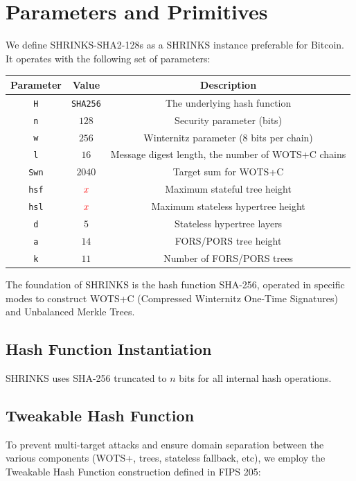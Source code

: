 \section{Parameters and Primitives}

We define SHRINKS-SHA2-128s as a SHRINKS instance preferable for Bitcoin. It operates with the 
following set of parameters:

\begin{center}
\begin{tabular}{ c c c }
 Parameter & Value & Description \\ 
 \hline
 \texttt{H} & \texttt{SHA256} & The underlying hash function \\ 
 \texttt{n} & $128$ & Security parameter (bits) \\  
 \texttt{w} & $256$ & Winternitz parameter (8 bits per chain) \\
 \texttt{l}  & $16$ & Message digest length, the number of WOTS+C chains \\
 \texttt{Swn} & $2040$ & Target sum for WOTS+C \\
 \texttt{hsf} & $\color{red}x\color{black}$ & Maximum stateful tree height \\
 \texttt{hsl} & $\color{red}x\color{black}$ & Maximum stateless hypertree height \\
 \texttt{d} & $5$ & Stateless hypertree layers \\
 \texttt{a} & $14$ & FORS/PORS tree height \\
 \texttt{k} & $11$ & Number of FORS/PORS trees 
\end{tabular}
\end{center}

The foundation of SHRINKS is the hash function SHA-256, operated in specific modes to construct 
WOTS+C (Compressed Winternitz One-Time Signatures) and Unbalanced Merkle Trees.

\subsection{Hash Function Instantiation}

SHRINKS uses SHA-256 truncated to $n$ bits for all internal hash operations. 

\subsection{Tweakable Hash Function}

To prevent multi-target attacks and ensure domain separation between the various components 
(WOTS+, trees, stateless fallback, etc), we employ the Tweakable Hash Function construction defined in 
FIPS 205:


